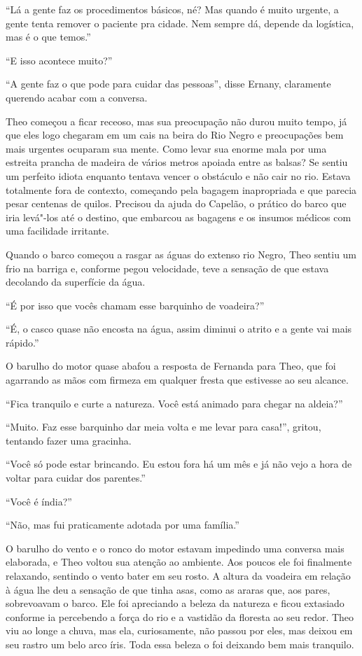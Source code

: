``Lá a gente faz os procedimentos básicos, né? Mas quando é muito
urgente, a gente tenta remover o paciente pra cidade. Nem sempre dá,
depende da logística, mas é o que temos.''

``E isso acontece muito?''

``A gente faz o que pode para cuidar das pessoas'', disse Ernany,
claramente querendo acabar com a conversa.

Theo começou a ficar receoso, mas sua preocupação não durou muito tempo,
já que eles logo chegaram em um cais na beira do Rio Negro e
preocupações bem mais urgentes ocuparam sua mente. Como levar sua enorme
mala por uma estreita prancha de madeira de vários metros apoiada entre
as balsas? Se sentiu um perfeito idiota enquanto tentava vencer o
obstáculo e não cair no rio. Estava totalmente fora de contexto,
começando pela bagagem inapropriada e que parecia pesar centenas de
quilos. Precisou da ajuda do Capelão, o prático do barco que iria
levá"-los até o destino, que embarcou as bagagens e os insumos médicos
com uma facilidade irritante.

Quando o barco começou a rasgar as águas do extenso rio Negro, Theo
sentiu um frio na barriga e, conforme pegou velocidade, teve a sensação
de que estava decolando da superfície da água.

``É por isso que vocês chamam esse barquinho de voadeira?''

``É, o casco quase não encosta na água, assim diminui o atrito e a gente
vai mais rápido.''

O barulho do motor quase abafou a resposta de
Fernanda para Theo, que foi agarrando as mãos com firmeza em qualquer
fresta que estivesse ao seu alcance.

``Fica tranquilo e curte a natureza. Você está animado para chegar na
aldeia?''

``Muito. Faz esse barquinho dar meia volta e me levar para casa!'',
gritou, tentando fazer uma gracinha.

``Você só pode estar brincando. Eu estou fora há um mês e já não vejo a
hora de voltar para cuidar dos parentes.''

``Você é índia?''

``Não, mas fui praticamente adotada por uma família.''

O barulho do vento e o ronco do motor estavam impedindo uma
conversa mais elaborada, e Theo voltou sua atenção ao ambiente. Aos
poucos ele foi finalmente relaxando, sentindo o vento bater em seu
rosto. A altura da voadeira em relação à água lhe deu a sensação de que
tinha asas, como as araras que, aos pares, sobrevoavam o barco. Ele
foi apreciando a beleza da natureza e ficou extasiado conforme ia
percebendo a força do rio e a vastidão da floresta ao seu redor. Theo
viu ao longe a chuva, mas ela, curiosamente, não passou por eles, mas
deixou em seu rastro um belo arco íris. Toda essa beleza o foi
deixando bem mais tranquilo.

